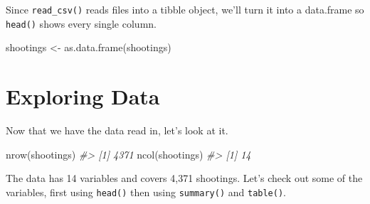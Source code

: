 \documentclass[
]{krantz}
\makeatletter
\newenvironment{Shaded}{\begin{snugshade}}{\end{snugshade}}
\newcommand{\CommentTok}[1]{\textcolor[rgb]{0.37,0.37,0.37}{\textit{#1}}}
\newcommand{\FunctionTok}[1]{\textcolor[rgb]{0,0,0}{#1}}
\newcommand{\NormalTok}[1]{#1}
\newcommand{\OtherTok}[1]{\textcolor[rgb]{0.37,0.37,0.37}{#1}}
\newenvironment{kframe}{%
\medskip{}
\setlength{\fboxsep}{.8em}
 \def\at@end@of@kframe{}%
 \ifinner\ifhmode%
  \def\at@end@of@kframe{\end{minipage}}%
  \begin{minipage}{\columnwidth}%
 \fi\fi%
 \def\FrameCommand##1{\hskip\@totalleftmargin \hskip-\fboxsep
 \colorbox{shadecolor}{##1}\hskip-\fboxsep
     \hskip-\linewidth \hskip-\@totalleftmargin \hskip\columnwidth}%
 \MakeFramed {\advance\hsize-\width
   \@totalleftmargin\z@ \linewidth\hsize
   \@setminipage}}%
 {\par\unskip\endMakeFramed%
 \at@end@of@kframe}
\renewenvironment{Shaded}{\begin{kframe}}{\end{kframe}}
\makeatother
\begin{document}
Since \texttt{read\_csv()} reads files into a tibble object, we'll turn it into a data.frame so \texttt{head()} shows every single column.

\begin{Shaded}
\begin{Highlighting}[]
\NormalTok{shootings }\OtherTok{\textless{}{-}} \FunctionTok{as.data.frame}\NormalTok{(shootings)}
\end{Highlighting}
\end{Shaded}

\hypertarget{exploring-data}{%
\section{Exploring Data}\label{exploring-data}}

Now that we have the data read in, let's look at it.

\begin{Shaded}
\begin{Highlighting}[]
\FunctionTok{nrow}\NormalTok{(shootings)}
\CommentTok{\#\textgreater{} [1] 4371}
\FunctionTok{ncol}\NormalTok{(shootings)}
\CommentTok{\#\textgreater{} [1] 14}
\end{Highlighting}
\end{Shaded}

The data has 14 variables and covers 4,371 shootings. Let's check out some of the variables, first using \texttt{head()} then using \texttt{summary()} and \texttt{table()}.
\end{document}
